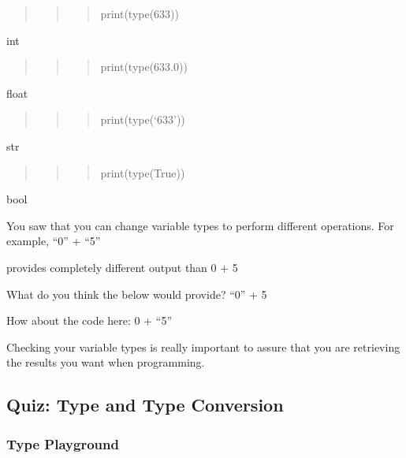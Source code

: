 \documentclass[11pt]{article}
\begin{document}
\begin{quote}
\begin{quote}
\begin{quote}
print(type(633))
\end{quote}
\end{quote}
\end{quote}

int

\begin{quote}
\begin{quote}
\begin{quote}
print(type(633.0))
\end{quote}
\end{quote}
\end{quote}

float

\begin{quote}
\begin{quote}
\begin{quote}
print(type(`633'))
\end{quote}
\end{quote}
\end{quote}

str

\begin{quote}
\begin{quote}
\begin{quote}
print(type(True))
\end{quote}
\end{quote}
\end{quote}

bool

You saw that you can change variable types to perform different
operations. For example, ``0'' + ``5''

provides completely different output than 0 + 5

What do you think the below would provide? ``0'' + 5

How about the code here: 0 + ``5''

Checking your variable types is really important to assure that you are
retrieving the results you want when programming.

    \hypertarget{quiz-type-and-type-conversion}{%
\subsection{Quiz: Type and Type
Conversion}\label{quiz-type-and-type-conversion}}

    \hypertarget{type-playground}{%
\subsubsection{Type Playground}\label{type-playground}}
\end{document}
